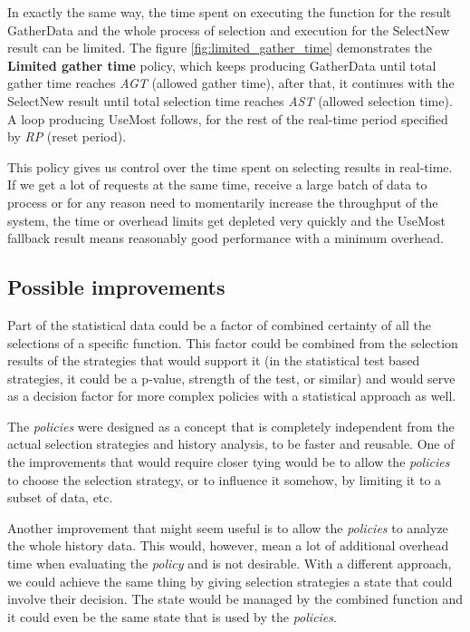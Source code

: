 In exactly the same way, the time spent on executing the function for the result GatherData and the whole process of selection and execution for the SelectNew result can be limited. The figure \ref{fig:limited_gather_time} demonstrates the \textbf{Limited gather time} policy, which keeps producing GatherData until total gather time reaches \textit{AGT} (allowed gather time), after that, it continues with the SelectNew result until total selection time reaches \textit{AST} (allowed selection time). A loop producing UseMost follows, for the rest of the real-time period specified by \textit{RP} (reset period).

This policy gives us control over the time spent on selecting results in real-time. If we get a lot of requests at the same time, receive a large batch of data to process or for any reason need to momentarily increase the throughput of the system, the time or overhead limits get depleted very quickly and the UseMost fallback result means reasonably good performance with a minimum overhead.

\subsection{Possible improvements}

Part of the statistical data could be a factor of combined certainty of all the selections of a specific function. This factor could be combined from the selection results of the strategies that would support it (in the statistical test based strategies, it could be a p-value, strength of the test, or similar) and would serve as a decision factor for more complex policies with a statistical approach as well.

The \textit{policies} were designed as a concept that is completely independent from the actual selection strategies and history analysis, to be faster and reusable. One of the improvements that would require closer tying would be to allow the \textit{policies} to choose the selection strategy, or to influence it somehow, by limiting it to a subset of data, etc. 

Another improvement that might seem useful is to allow the \textit{policies} to analyze the whole history data. This would, however, mean a lot of additional overhead time when evaluating the \textit{policy} and is not desirable.
With a different approach, we could achieve the same thing by giving selection strategies a state that could involve their decision. The state would be managed by the combined function and it could even be the same state that is used by the \textit{policies}. 

